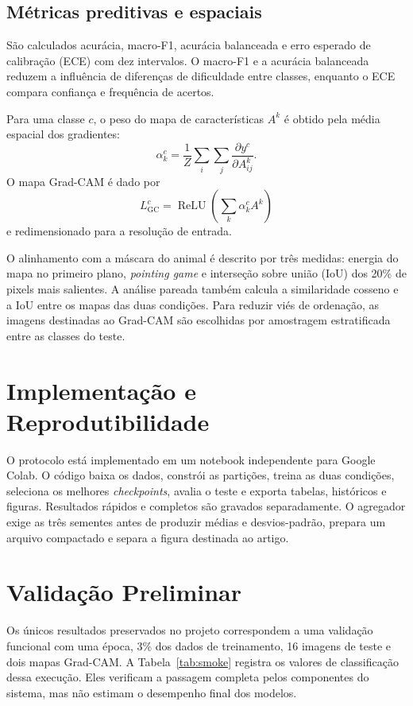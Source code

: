 \documentclass[conference]{IEEEtran}
\begin{document}
\subsection{Métricas preditivas e espaciais}

São calculados acurácia, macro-F1, acurácia balanceada e erro esperado de calibração (ECE) com dez intervalos. O macro-F1 e a acurácia balanceada reduzem a influência de diferenças de dificuldade entre classes, enquanto o ECE compara confiança e frequência de acertos.

Para uma classe $c$, o peso do mapa de características $A^k$ é obtido pela média espacial dos gradientes:
\begin{equation}
\alpha_k^c=\frac{1}{Z}\sum_i\sum_j\frac{\partial y^c}{\partial A_{ij}^k}.
\end{equation}
O mapa Grad-CAM é dado por
\begin{equation}
L_{\mathrm{GC}}^c=\operatorname{ReLU}\left(\sum_k\alpha_k^c A^k\right)
\end{equation}
e redimensionado para a resolução de entrada.

O alinhamento com a máscara do animal é descrito por três medidas: energia do mapa no primeiro plano, \emph{pointing game} e interseção sobre união (IoU) dos 20\% de pixels mais salientes. A análise pareada também calcula a similaridade cosseno e a IoU entre os mapas das duas condições. Para reduzir viés de ordenação, as imagens destinadas ao Grad-CAM são escolhidas por amostragem estratificada entre as classes do teste.

\section{Implementação e Reprodutibilidade}

O protocolo está implementado em um notebook independente para Google Colab. O código baixa os dados, constrói as partições, treina as duas condições, seleciona os melhores \emph{checkpoints}, avalia o teste e exporta tabelas, históricos e figuras. Resultados rápidos e completos são gravados separadamente. O agregador exige as três sementes antes de produzir médias e desvios-padrão, prepara um arquivo compactado e separa a figura destinada ao artigo.

\section{Validação Preliminar}

Os únicos resultados preservados no projeto correspondem a uma validação funcional com uma época, 3\% dos dados de treinamento, 16 imagens de teste e dois mapas Grad-CAM. A Tabela~\ref{tab:smoke} registra os valores de classificação dessa execução. Eles verificam a passagem completa pelos componentes do sistema, mas não estimam o desempenho final dos modelos.
\end{document}
